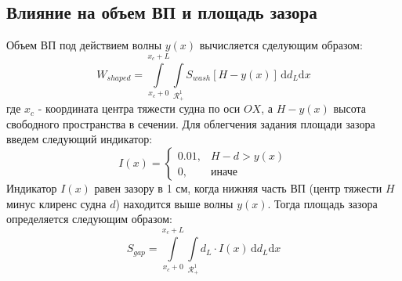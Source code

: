 \documentclass{article}%
\numberwithin{equation}{subsection}
\let\oldsubsection\subsection%
\renewcommand{\subsection}{%
  \renewcommand{\theequation}{\thesubsection.\arabic{equation}}%
  \oldsubsection}%
\begin{document}
\subsection{Влияние на объем ВП и площадь зазора}
Объем ВП под действием волны $y(x)$ вычисляется сделующим образом:
\begin{equation}
    W_{shaped} = \int\limits_{x_c + 0}^{x_c + L}\int\limits_{\mathcal{R}_{+}^{1}}S_{wash}\left[H - y(x)\right]\,\mathrm{d}d_L\mathrm{d}x
\end{equation}
где $x_c$ - координата центра тяжести судна по оси $OX$, а $H-y(x)$ высота свободного пространства в сечении. Для облегчения задания площади зазора введем следующий индикатор:
\begin{equation}
    I(x) = 
    \begin{cases*}
        0.01, &H-d > y(x)\\
        0,&\text{иначе}
    \end{cases*}
\end{equation}
Индикатор $I(x)$ равен зазору в 1 см, когда нижняя часть ВП (центр тяжести $H$ минус клиренс судна $d$) находится выше волны $y(x)$. Тогда площадь зазора определяется следующим образом:
\begin{equation}
    S_{gap} = \int\limits_{x_c + 0}^{x_c + L}\int\limits_{\mathcal{R}_{+}^{1}}d_L \cdot I(x)\,\mathrm{d}d_L\mathrm{d}x
\end{equation}
\end{document}
